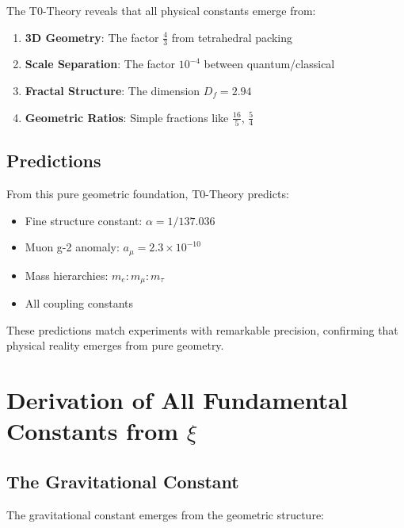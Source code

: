 \documentclass[12pt,a4paper]{article}
\newcommand{\xipar}{\xi}  %
\begin{document}
	The T0-Theory reveals that all physical constants emerge from:
	
	\begin{enumerate}
		\item \textbf{3D Geometry}: The factor $\frac{4}{3}$ from tetrahedral packing
		\item \textbf{Scale Separation}: The factor $10^{-4}$ between quantum/classical
		\item \textbf{Fractal Structure}: The dimension $D_f = 2.94$
		\item \textbf{Geometric Ratios}: Simple fractions like $\frac{16}{5}$, $\frac{5}{4}$
	\end{enumerate}
	
	\subsection{Predictions}
	
	From this pure geometric foundation, T0-Theory predicts:
	
	\begin{itemize}
		\item Fine structure constant: $\alpha = 1/137.036$
		\item Muon g-2 anomaly: $a_\mu = 2.3 \times 10^{-10}$
		\item Mass hierarchies: $m_e : m_\mu : m_\tau$
		\item All coupling constants
	\end{itemize}
	
	These predictions match experiments with remarkable precision, confirming that physical reality emerges from pure geometry.
	
	\section{Derivation of All Fundamental Constants from $\xipar$}
	
	\subsection{The Gravitational Constant}
	
	The gravitational constant emerges from the geometric structure:
	
\end{document}
